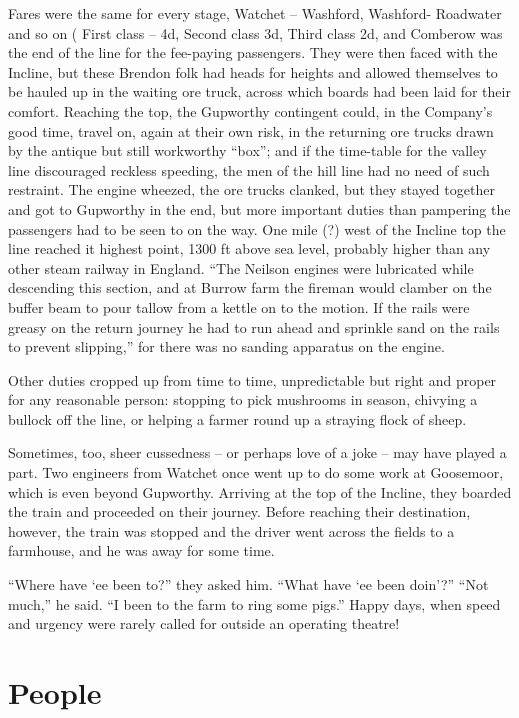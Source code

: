 \documentclass[10pt,a4paper]{article}
\begin{document}
Fares were the same for every stage, Watchet – Washford, Washford- Roadwater and so on ( First class – 4d, Second class 3d, Third class 2d, and Comberow was the end of the line for the fee-paying passengers.  They were then faced with the Incline, but these Brendon folk had heads for heights and allowed themselves to be hauled up in the waiting ore truck, across which boards had been laid for their comfort. Reaching the top, the Gupworthy contingent could, in the Company’s good time, travel on, again at their own risk, in the returning ore trucks drawn by the antique but still workworthy “box”; and if the time-table for the valley line discouraged reckless speeding,  the men of the hill line had no need of such restraint. The engine wheezed, the ore trucks clanked, but they stayed together and got to Gupworthy in the end, but more important duties than pampering the  passengers had to be seen to on the way. One mile (?)  west of the Incline top the line reached it highest point, 1300 ft above sea level, probably higher than any other steam railway in England. “The Neilson engines were lubricated while descending this section, and at Burrow farm the fireman would clamber on the buffer beam to pour tallow from a kettle on to the motion. If the rails were greasy on the return journey he had to run ahead and sprinkle sand on the rails to prevent slipping,” for there was no sanding apparatus on the engine.


Other duties cropped up from time to time, unpredictable but right and proper for any reasonable person:  stopping to pick mushrooms in season, chivying a bullock off the line, or helping a farmer round up a straying flock of sheep.

Sometimes, too, sheer cussedness – or perhaps love of a joke – may have played a part. Two engineers from Watchet once went up to do some work at Goosemoor, which is even beyond Gupworthy. Arriving at the top of the Incline, they boarded the train and proceeded on their journey. Before reaching their destination, however, the train was stopped and the driver went across the fields to a farmhouse, and he was away for some time.

  “Where have ‘ee been to?” they asked him. “What have ‘ee been doin’?”
  “Not much,” he said. “I been to the farm to ring some pigs.”
      Happy days, when speed and urgency were rarely called for outside an operating theatre! 
      
\section{People}    
\end{document}
